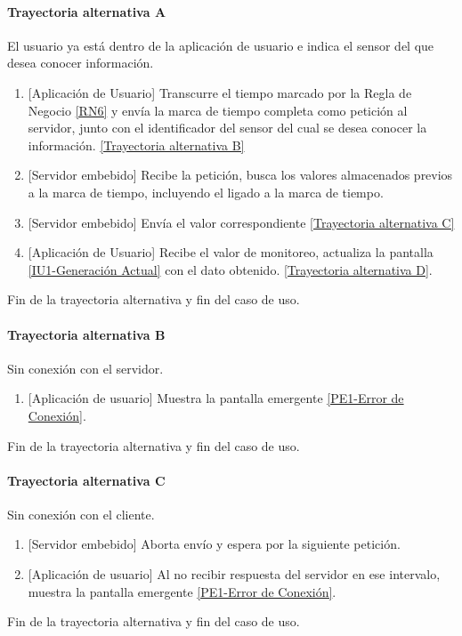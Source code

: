 \paragraph{Trayectoria alternativa A} \label{SUB-U-CU1.2:TA}
	El usuario ya está dentro de la aplicación de usuario e indica el sensor del que desea conocer información.
	\begin{enumerate}[label=A\arabic*.]
		\item {[Aplicación de Usuario]} Transcurre el tiempo marcado por la Regla de Negocio \ref{RN6} y envía la marca de tiempo completa como petición al servidor, junto con el identificador del sensor del cual se desea conocer la información. \hyperref[SUB-U-CU1.2:TB]{[Trayectoria alternativa B]} 
		\item {[Servidor embebido]} Recibe la petición, busca los valores almacenados previos a la marca de tiempo, incluyendo el ligado a la marca de tiempo.
		\item  {[Servidor embebido]} Envía el valor correspondiente \hyperref[SUB-U-CU1.2:TC]{[Trayectoria alternativa C]}
        \item {[Aplicación de Usuario]} Recibe el valor de monitoreo, actualiza la pantalla \hyperref[fig:monitoreo]{[IU1-Generación Actual]} con el dato obtenido.
        \hyperref[SUB-U-CU1.2:TD]{[Trayectoria alternativa D]}.
	\end{enumerate}
	Fin de la trayectoria alternativa y fin del caso de uso.

\paragraph{Trayectoria alternativa B} \label{SUB-U-CU1.2:TB}
	Sin conexión con el servidor.
	\begin{enumerate}[label=B\arabic*.]
		\item {[Aplicación de usuario]} Muestra la pantalla emergente \hyperref[fig:Error de Conexion]{[PE1-Error de Conexión]}.
	\end{enumerate}
	Fin de la trayectoria alternativa y fin del caso de uso.


\paragraph{Trayectoria alternativa C} \label{SUB-U-CU1.2:TC}
	Sin conexión con el cliente.
	\begin{enumerate}[label=C\arabic*.]
		\item {[Servidor embebido]} Aborta envío y espera por la siguiente petición.
		\item {[Aplicación de usuario]} Al no recibir respuesta del servidor en ese intervalo, muestra la pantalla emergente \hyperref[fig:Error de Conexion]{[PE1-Error de Conexión]}.
	\end{enumerate}
	Fin de la trayectoria alternativa y fin del caso de uso.
	
